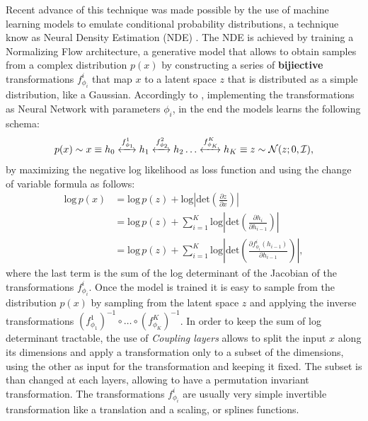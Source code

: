 Recent advance of this technique was made possible by the use of machine learning models to emulate conditional probability distributions, a technique know as Neural Density Estimation (NDE) \cite{papamakariosNeuralDensityEstimation2019}. The NDE is achieved by training a Normalizing Flow architecture, a generative model that allows to obtain samples from a complex distribution $p(x)$ by constructing a series of \textbf{bijiective} transformations  $f_{\phi_i}^i$ that map $x$ to a latent space $z$ that is distributed as a simple distribution, like a Gaussian. Accordingly to \cite{kingmaGlowGenerativeFlow2018}, implementing the transformations as Neural Network with parameters $\phi_i$, in the end the models learns the following schema:
\begin{equation}
p(x) \sim x \equiv h_0 \xleftrightarrow{\text{$f_{\phi_1}^1$}} h_1 \xleftrightarrow{\text{$f_{\phi_2}^2$}} h_2 \dots \xleftrightarrow{\text{$f_{\phi_K}^K$}} h_K \equiv z \sim \mathcal{N}(z; 0, \mathcal{I}),
\end{equation}
by maximizing the negative log likelihood as loss function and using the change of variable formula as follows:
\begin{equation}
\begin{aligned}
    \text{log} \, p(x) &= \text{log} \, p(z) + \text{log} \left| \text{det} \left( \frac{\partial z}{\partial x} \right) \right| \\
    &= \text{log} \, p(z) + \sum_{i=1}^K \text{log} \left| \text{det} \left( \frac{\partial h_{i}}{\partial h_{i-1}} \right) \right| \\
    &= \text{log} \, p(z) + \sum_{i=1}^K \text{log} \left| \text{det} \left( \frac{\partial f_{\phi_i}^i(h_{i-1})}{\partial h_{i-1}} \right) \right|,
\end{aligned}
\end{equation}
where the last term is the sum of the log determinant of the Jacobian of the transformations $f_{\phi_i}^i$. Once the model is trained it is easy to sample from the distribution $p(x)$ by sampling from the latent space $z$ and applying the inverse transformations $(f_{\phi_1}^1)^{-1} \circ \dots \circ (f_{\phi_K}^K)^{-1}$.
In order to keep the sum of log determinant tractable, the use of \textit{Coupling layers} allows to split the input $x$ along its dimensions and apply a transformation only to a subset of the dimensions, using the other as input for the transformation and keeping it fixed. The subset is than changed at each layers, allowing to have a permutation invariant transformation. The transformations $f^{i}_{\phi_i}$ are usually very simple invertible transformation like a translation and a scaling, or splines functions. 

